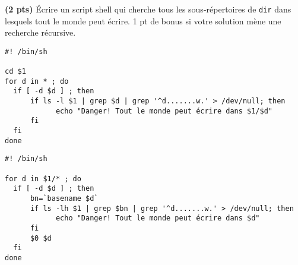 \documentclass[10pt]{article}
\begin{document}
\begin{Exercice} \textbf{(2 pts)}
  Écrire un script shell  qui cherche tous les sous-répertoires
  de \texttt{dir} dans lesquels tout le monde peut écrire. 1 pt de bonus si votre
  solution mène une recherche récursive.
  \begin{Reponse}
    \begin{Verbatim}[label=Version de base]
#! /bin/sh

cd $1
for d in * ; do
  if [ -d $d ] ; then
      if ls -l $1 | grep $d | grep '^d.......w.' > /dev/null; then
            echo "Danger! Tout le monde peut écrire dans $1/$d"
      fi
  fi
done
\end{Verbatim}
\begin{Verbatim}[label=Version récursive]
#! /bin/sh

for d in $1/* ; do
  if [ -d $d ] ; then
      bn=`basename $d`
      if ls -lh $1 | grep $bn | grep '^d.......w.' > /dev/null; then
            echo "Danger! Tout le monde peut écrire dans $d"
      fi
      $0 $d
  fi
done
    \end{Verbatim}
  \end{Reponse}
\end{Exercice}
\end{document}
